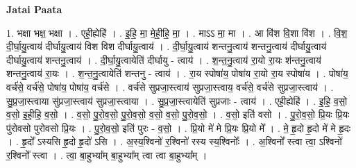 \documentclass[17pt]{extarticle}
\begin{document}
\textbf{Jatai Paata} \newline

1. भक्षा भक्ष॒ भक्षा । . एही॒ह्येहि॑ । . इ॒हि॒ मा॒ मे॒ही॒हि॒ मा॒ । . माऽऽ मा॒ मा । . आ वि॑श वि॒शा वि॑श । . वि॒श॒ दी॒र्घा॒यु॒त्वाय॑ दीर्घायु॒त्वाय॑ विश विश दीर्घायु॒त्वाय॑ । . दी॒र्घा॒यु॒त्वाय॑ शन्तनु॒त्वाय॑ शन्तनु॒त्वाय॑ दीर्घायु॒त्वाय॑ दीर्घायु॒त्वाय॑ शन्तनु॒त्वाय॑ । . दी॒र्घा॒यु॒त्वायेति॑ दीर्घायु - त्वाय॑ । . श॒न्त॒नु॒त्वाय॑ रा॒यो रा॒यः श॑न्तनु॒त्वाय॑ शन्तनु॒त्वाय॑ रा॒यः । . श॒न्त॒नु॒त्वायेति॑ शन्तनु - त्वाय॑ । . रा॒य स्पोषा॑य॒ पोषा॑य रा॒यो रा॒य स्पोषा॑य । . पोषा॑य॒ वर्च॑से॒ वर्च॑से॒ पोषा॑य॒ पोषा॑य॒ वर्च॑से । . वर्च॑से सुप्रजा॒स्त्वाय॑ सुप्रजा॒स्त्वाय॒ वर्च॑से॒ वर्च॑से सुप्रजा॒स्त्वाय॑ । . सु॒प्र॒जा॒स्त्वाया सु॑प्रजा॒स्त्वाय॑ सुप्रजा॒स्त्वाया । . सु॒प्र॒जा॒स्त्वायेति॑ सुप्रजाः - त्वाय॑ । . एही॒ह्येहि॑ । . इ॒हि॒ व॒सो॒ व॒सो॒ इ॒ही॒हि॒ व॒सो॒ । . व॒सो॒ पु॒रो॒व॒सो॒ पु॒रो॒व॒सो॒ व॒सो॒ व॒सो॒ पु॒रो॒व॒सो॒ । . व॒सो॒ इति॑ वसो । . पु॒रो॒व॒सो॒ प्रि॒यः प्रि॒यः पु॑रोवसो पुरोवसो प्रि॒यः । . पु॒रो॒व॒सो॒ इति॑ पुरः - व॒सो॒ । . प्रि॒यो मे॑ मे प्रि॒यः प्रि॒यो मे᳚ । . मे॒ हृ॒दो हृ॒दो मे॑ मे हृ॒दः । . हृ॒दो᳚ ऽस्यसि हृ॒दो हृ॒दो॑ ऽसि । . अ॒स्य॒श्विनो॑ र॒श्विनो॑ रस्य स्य॒श्विनोः᳚ । . अ॒श्विनो᳚ स्त्वा त्वा॒ ऽश्विनो॑ र॒श्विनो᳚ स्त्वा । . त्वा॒ बा॒हुभ्या᳚म् बा॒हुभ्या᳚म् त्वा त्वा बा॒हुभ्या᳚म् । \newline
\end{document}
